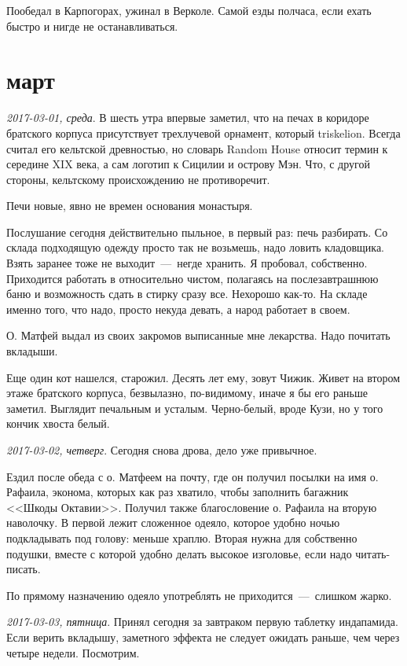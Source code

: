\documentclass[
    12pt
    ,a4paper
    ,oneside
    ,russian
]{memoir}
\newcommand{\mydatestamp}{
    \bigskip   %
    \emph
}
\newcommand{\mds}{\mydatestamp}
\begin{document}
    Пообедал в Карпогорах, ужинал в Верколе. Самой езды полчаса, если ехать быстро и нигде не останавливаться.
    
    \section*{март}
    
    \mds{2017-03-01, среда}. В шесть утра впервые заметил, что на печах в коридоре братского корпуса присутствует трехлучевой орнамент, который triskelion. Всегда считал его кельтской древностью, но словарь Random House относит термин к середине XIX века, а сам логотип к Сицилии и острову Мэн. Что, с другой стороны, кельтскому происхождению не противоречит.
    
    Печи новые, явно не времен основания монастыря.
    
    Послушание сегодня действительно пыльное, в первый раз: печь разбирать. Со склада подходящую одежду просто так не возьмешь, надо ловить кладовщика. Взять заранее тоже не выходит~---~негде хранить. Я пробовал, собственно. Приходится работать в относительно чистом, полагаясь на послезавтрашнюю баню и возможность сдать в стирку сразу все. Нехорошо как-то. На складе именно того, что надо, просто некуда девать, а народ работает в своем.
    
    О. Матфей выдал из своих закромов выписанные мне лекарства. Надо почитать вкладыши.
    
    Еще один кот нашелся, старожил. Десять лет ему, зовут Чижик. Живет на втором этаже братского корпуса, безвылазно, по-видимому, иначе я бы его раньше заметил. Выглядит печальным и усталым. Черно-белый, вроде Кузи, но у того кончик хвоста белый.
    
    \mds{2017-03-02, четверг}. Сегодня снова дрова, дело уже привычное.
    
    Ездил после обеда с о. Матфеем на почту, где он получил посылки на имя о. Рафаила, эконома, которых как раз хватило, чтобы заполнить багажник <<Шкоды Октавии>>. Получил также благословение о. Рафаила на вторую наволочку. В первой лежит сложенное одеяло, которое удобно ночью подкладывать под голову: меньше храплю. Вторая нужна для собственно подушки, вместе с которой удобно делать высокое изголовье, если надо читать-писать.
    
    По прямому назначению одеяло употреблять не приходится~---~слишком жарко.
    
    \mds{2017-03-03, пятница}. Принял сегодня за завтраком первую таблетку индапамида. Если верить вкладышу, заметного эффекта не следует ожидать раньше, чем через четыре недели. Посмотрим.
    
\end{document}
